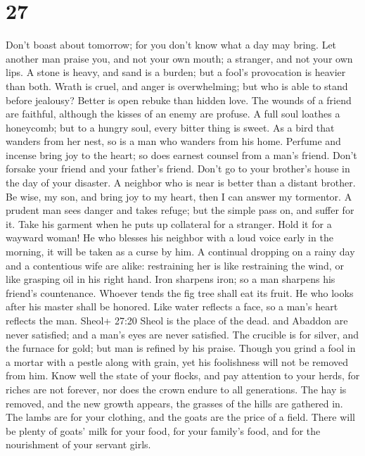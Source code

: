 \hypertarget{section-21}{%
\section{27}\label{section-21}}

 Don't boast about tomorrow; for you don't know what a day
may bring.  Let another man praise you, and not your own
mouth; a stranger, and not your own lips.  A stone is heavy,
and sand is a burden; but a fool's provocation is heavier than both.
 Wrath is cruel, and anger is overwhelming; but who is able
to stand before jealousy?  Better is open rebuke than hidden
love.  The wounds of a friend are faithful, although the
kisses of an enemy are profuse.  A full soul loathes a
honeycomb; but to a hungry soul, every bitter thing is sweet.
 As a bird that wanders from her nest, so is a man who
wanders from his home.  Perfume and incense bring joy to the
heart; so does earnest counsel from a man's friend.  Don't
forsake your friend and your father's friend. Don't go to your brother's
house in the day of your disaster. A neighbor who is near is better than
a distant brother.  Be wise, my son, and bring joy to my
heart, then I can answer my tormentor.  A prudent man sees
danger and takes refuge; but the simple pass on, and suffer for it.
 Take his garment when he puts up collateral for a
stranger. Hold it for a wayward woman!  He who blesses his
neighbor with a loud voice early in the morning, it will be taken as a
curse by him.  A continual dropping on a rainy day and a
contentious wife are alike:  restraining her is like
restraining the wind, or like grasping oil in his right hand.
 Iron sharpens iron; so a man sharpens his friend's
countenance.  Whoever tends the fig tree shall eat its
fruit. He who looks after his master shall be honored. 
Like water reflects a face, so a man's heart reflects the man.
 Sheol+ 27:20 Sheol is the place of the dead. and Abaddon
are never satisfied; and a man's eyes are never satisfied. 
The crucible is for silver, and the furnace for gold; but man is refined
by his praise.  Though you grind a fool in a mortar with a
pestle along with grain, yet his foolishness will not be removed from
him.  Know well the state of your flocks, and pay attention
to your herds,  for riches are not forever, nor does the
crown endure to all generations.  The hay is removed, and
the new growth appears, the grasses of the hills are gathered in.
 The lambs are for your clothing, and the goats are the
price of a field.  There will be plenty of goats' milk for
your food, for your family's food, and for the nourishment of your
servant girls.

